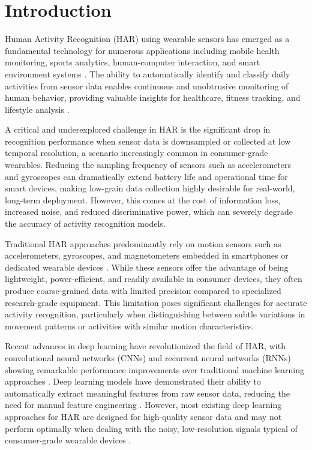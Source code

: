 \chapter{Introduction}

Human Activity Recognition (HAR) using wearable sensors has emerged as a fundamental technology for numerous applications including mobile health monitoring, sports analytics, human-computer interaction, and smart environment systems \cite{Bulling2014HARSurvey, Lara2013Mobile}. The ability to automatically identify and classify daily activities from sensor data enables continuous and unobtrusive monitoring of human behavior, providing valuable insights for healthcare, fitness tracking, and lifestyle analysis \cite{Shoaib2015Survey}.

A critical and underexplored challenge in HAR is the significant drop in recognition performance when sensor data is downsampled or collected at low temporal resolution, a scenario increasingly common in consumer-grade wearables. Reducing the sampling frequency of sensors such as accelerometers and gyroscopes can dramatically extend battery life and operational time for smart devices, making low-grain data collection highly desirable for real-world, long-term deployment. However, this comes at the cost of information loss, increased noise, and reduced discriminative power, which can severely degrade the accuracy of activity recognition models.

Traditional HAR approaches predominantly rely on motion sensors such as accelerometers, gyroscopes, and magnetometers embedded in smartphones or dedicated wearable devices \cite{Chen2021WearableHAR}. While these sensors offer the advantage of being lightweight, power-efficient, and readily available in consumer devices, they often produce coarse-grained data with limited precision compared to specialized research-grade equipment. This limitation poses significant challenges for accurate activity recognition, particularly when distinguishing between subtle variations in movement patterns or activities with similar motion characteristics.

Recent advances in deep learning have revolutionized the field of HAR, with convolutional neural networks (CNNs) and recurrent neural networks (RNNs) showing remarkable performance improvements over traditional machine learning approaches \cite{Wang2019DeepHAR, Yang2015DeepConvLSTM}. Deep learning models have demonstrated their ability to automatically extract meaningful features from raw sensor data, reducing the need for manual feature engineering \cite{Hammerla2016Deep, Ronao2016Human}. However, most existing deep learning approaches for HAR are designed for high-quality sensor data and may not perform optimally when dealing with the noisy, low-resolution signals typical of consumer-grade wearable devices \cite{Ignatov2018RealTime}.

